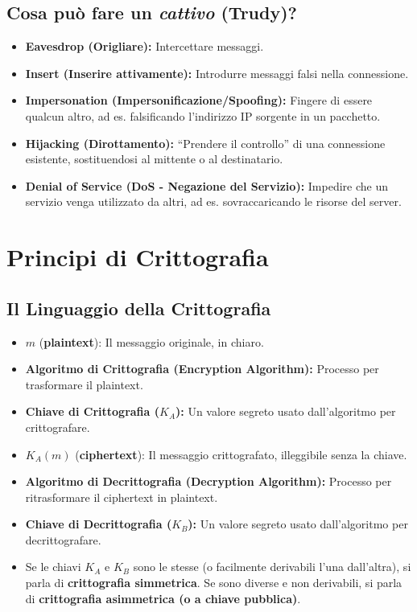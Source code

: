 \subsection{Cosa può fare un \textit{cattivo} (Trudy)?}
\begin{itemize}
    \item \textbf{Eavesdrop (Origliare):} Intercettare messaggi.
    \item \textbf{Insert (Inserire attivamente):} Introdurre messaggi falsi nella connessione.
    \item \textbf{Impersonation (Impersonificazione/Spoofing):} Fingere di essere qualcun altro, ad es. falsificando l'indirizzo IP sorgente in un pacchetto.
    \item \textbf{Hijacking (Dirottamento):} \textquotedblleft Prendere il controllo\textquotedblright{} di una connessione esistente, sostituendosi al mittente o al destinatario.
    \item \textbf{Denial of Service (DoS - Negazione del Servizio):} Impedire che un servizio venga utilizzato da altri, ad es. sovraccaricando le risorse del server.
\end{itemize}

\section{Principi di Crittografia}
\label{sec:principi_crittografia}

\subsection{Il Linguaggio della Crittografia}
\begin{itemize}
    \item $m$ (\textbf{plaintext}): Il messaggio originale, in chiaro.
    \item \textbf{Algoritmo di Crittografia (Encryption Algorithm):} Processo per trasformare il plaintext.
    \item \textbf{Chiave di Crittografia ($K_A$):} Un valore segreto usato dall'algoritmo per crittografare.
    \item $K_A(m)$ (\textbf{ciphertext}): Il messaggio crittografato, illeggibile senza la chiave.
    \item \textbf{Algoritmo di Decrittografia (Decryption Algorithm):} Processo per ritrasformare il ciphertext in plaintext.
    \item \textbf{Chiave di Decrittografia ($K_B$):} Un valore segreto usato dall'algoritmo per decrittografare.
    \item Se le chiavi $K_A$ e $K_B$ sono le stesse (o facilmente derivabili l'una dall'altra), si parla di \textbf{crittografia simmetrica}. Se sono diverse e non derivabili, si parla di \textbf{crittografia asimmetrica (o a chiave pubblica)}.
\end{itemize}

